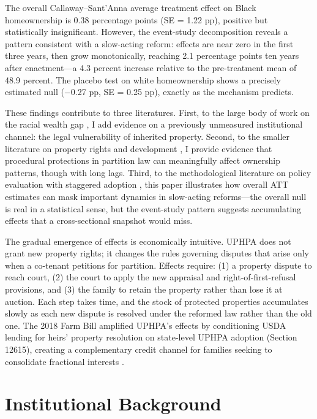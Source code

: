 \documentclass[12pt]{article}
\begin{document}
The overall Callaway--Sant'Anna average treatment effect on Black homeownership is 0.38 percentage points (SE = 1.22 pp), positive but statistically insignificant. However, the event-study decomposition reveals a pattern consistent with a slow-acting reform: effects are near zero in the first three years, then grow monotonically, reaching 2.1 percentage points ten years after enactment---a 4.3 percent increase relative to the pre-treatment mean of 48.9 percent. The placebo test on white homeownership shows a precisely estimated null ($-$0.27 pp, SE = 0.25 pp), exactly as the mechanism predicts.

These findings contribute to three literatures. First, to the large body of work on the racial wealth gap \citep{chetty2020, conley1999, shapiro2004, derenoncourt2021}, I add evidence on a previously unmeasured institutional channel: the legal vulnerability of inherited property. Second, to the smaller literature on property rights and development \citep{jorgensen2017}, I provide evidence that procedural protections in partition law can meaningfully affect ownership patterns, though with long lags. Third, to the methodological literature on policy evaluation with staggered adoption \citep{callaway2021, sunab2021, goodmanbacon2021}, this paper illustrates how overall ATT estimates can mask important dynamics in slow-acting reforms---the overall null is real in a statistical sense, but the event-study pattern suggests accumulating effects that a cross-sectional snapshot would miss.

The gradual emergence of effects is economically intuitive. UPHPA does not grant new property rights; it changes the rules governing disputes that arise only when a co-tenant petitions for partition. Effects require: (1) a property dispute to reach court, (2) the court to apply the new appraisal and right-of-first-refusal provisions, and (3) the family to retain the property rather than lose it at auction. Each step takes time, and the stock of protected properties accumulates slowly as each new dispute is resolved under the reformed law rather than the old one. The 2018 Farm Bill amplified UPHPA's effects by conditioning USDA lending for heirs' property resolution on state-level UPHPA adoption (Section 12615), creating a complementary credit channel for families seeking to consolidate fractional interests \citep{farmbill2018}.

\section{Institutional Background}
\end{document}
